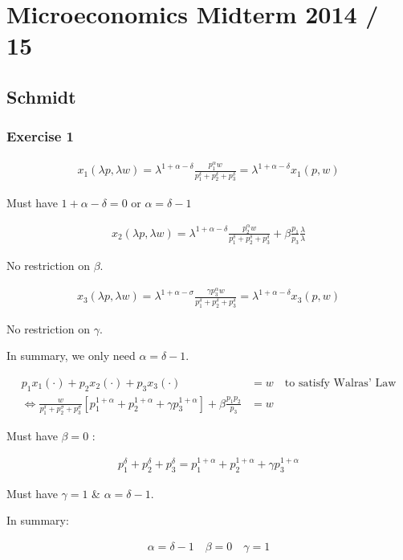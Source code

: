 \section*{Microeconomics Midterm 2014 / 15}

{
\subsection*{Schmidt}

\subsubsection*{Exercise 1}

\begin{enumerate}[label=(\alph*)]
{\item 
\begin{align*}
    x_{1}(\lambda p, \lambda w)=\lambda^{1+\alpha-\delta} \frac{p_{1}^{\alpha} w}{p_{1}^{\delta}+p_{2}^{\delta}+p_{3}^{\delta}}=\lambda^{1+\alpha-\delta} x_{1}(p, w)
\end{align*}

Must have $1+\alpha-\delta=0$ or $\alpha=\delta-1$

\begin{align*}
    x_{2}(\lambda p, \lambda w)=\lambda^{1+\alpha-\delta} \frac{p_{2}^{\alpha} w}{p_{1}^{\delta}+p_{2}^{\delta}+p_{3}^{\delta}}+\beta \frac{p_{1}}{p_{3}} \frac{\lambda}{\lambda}
\end{align*}

No restriction on $\beta$.

\begin{align*}
    x_{3}(\lambda p, \lambda w)=\lambda^{1+\alpha-\sigma} \frac{\gamma p_{3}^{\alpha} w}{p_{1}^{\delta}+p_{2}^{\delta}+p_{3}^{\delta}}=\lambda^{1+\alpha-\delta} x_{3}(p, w)
\end{align*}

No restriction on $\gamma$.

In summary, we only need $\alpha=\delta-1$.
}
{\item 

\begin{align*}
    p_{1} x_{1}(\cdot)+p_{2} x_{2}(\cdot)+p_{3} x_{3}(\cdot) &= w \quad \text{to satisfy Walras' Law} \\
    \Leftrightarrow \frac{w}{p_{1}^{\delta}+p_{2}^{\sigma}+p_{3}^{\sigma}}\left[p_{1}^{1+\alpha}+p_{2}^{1+\alpha}+\gamma p_{3}^{1+\alpha}\right]+\beta \frac{p_{1} p_{2}}{p_{3}} &= w
\end{align*}

Must have $\beta=0$ :

\begin{align*}
    p_{1}^{\delta}+p_{2}^{\delta}+p_{3}^{\delta}=p_{1}^{1+\alpha}+p_{2}^{1+\alpha}+\gamma p_{3}^{1+\alpha}
\end{align*}

Must have $\gamma=1$ \& $\alpha=\delta-1$.

In summary:

\begin{align*}
    \alpha=\delta-1 \quad \beta=0 \quad \gamma=1
\end{align*}
}
\end{enumerate}
}
